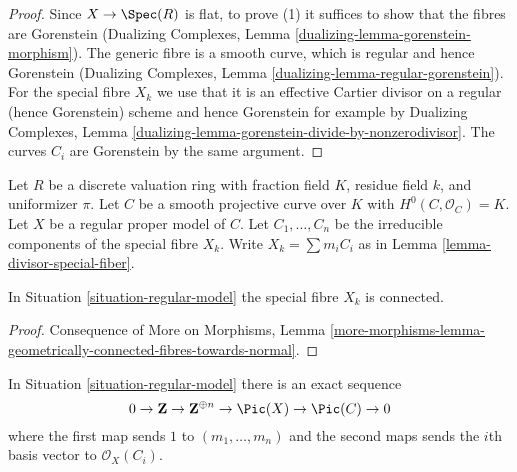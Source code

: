 \begin{proof}
Since $X \to \Spec(R)$ is flat, to prove (1)
it suffices to show that the fibres are Gorenstein
(Dualizing Complexes, Lemma \ref{dualizing-lemma-gorenstein-morphism}).
The generic fibre is a smooth curve, which is regular and hence Gorenstein
(Dualizing Complexes, Lemma \ref{dualizing-lemma-regular-gorenstein}).
For the special fibre $X_k$ we use that it is an effective
Cartier divisor on a regular (hence Gorenstein) scheme and hence
Gorenstein for example by Dualizing Complexes, Lemma
\ref{dualizing-lemma-gorenstein-divide-by-nonzerodivisor}.
The curves $C_i$ are Gorenstein by the same argument.
\end{proof}

\begin{situation}
\label{situation-regular-model}
Let $R$ be a discrete valuation ring with fraction field $K$,
residue field $k$, and uniformizer $\pi$.
Let $C$ be a smooth projective curve over $K$ with $H^0(C, \mathcal{O}_C) = K$.
Let $X$ be a regular proper model of $C$.
Let $C_1, \ldots, C_n$ be the irreducible components of the special
fibre $X_k$. Write $X_k = \sum m_i C_i$ as in
Lemma \ref{lemma-divisor-special-fiber}.
\end{situation}

\begin{lemma}
\label{lemma-regular-model-connected}
In Situation \ref{situation-regular-model} the special fibre $X_k$ is connected.
\end{lemma}

\begin{proof}
Consequence of More on Morphisms, Lemma
\ref{more-morphisms-lemma-geometrically-connected-fibres-towards-normal}.
\end{proof}

\begin{lemma}
\label{lemma-regular-model-pic}
In Situation \ref{situation-regular-model} there is an exact sequence
$$
0 \to \mathbf{Z} \to \mathbf{Z}^{\oplus n} \to
\Pic(X) \to \Pic(C) \to 0
$$
where the first map sends $1$ to $(m_1, \ldots, m_n)$ and the second
maps sends the $i$th basis vector to $\mathcal{O}_X(C_i)$.
\end{lemma}

